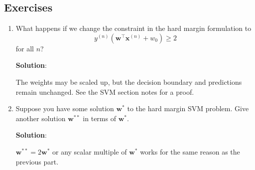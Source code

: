 \documentclass[11pt, letterpaper]{article}
\theoremstyle{definition}
\theoremstyle{plain}
\newenvironment{solution}{
    \vspace{2mm}
    \color{blue}\noindent\textbf{Solution}:
}{}
\begin{document}
\subsection{Exercises}

\begin{mdframed}
    \begin{enumerate}
        \item What happens if we change the constraint in the hard margin formulation to 
        \[y^{(n)}(\bm{w}^\top\bm{x}^{(n)} + w_0) \ge 2\]
        for all $n$?
        
        \begin{solution}
            The weights may be scaled up, but the decision boundary and predictions remain unchanged. See the SVM section notes for a proof.
        \end{solution}

        \item Suppose you have some solution $\bm{w}^*$ to the hard margin SVM problem. Give another solution $\bm{w}^{**}$ in terms of $\bm{w}^*$.   
  
        \begin{solution}
            $\bm{w}^{**} = 2\bm{w}^*$  or any scalar multiple of $\bm{w}^*$ works for the same reason as the previous part.
        \end{solution}
    \end{enumerate}
\end{mdframed}
\end{document}
